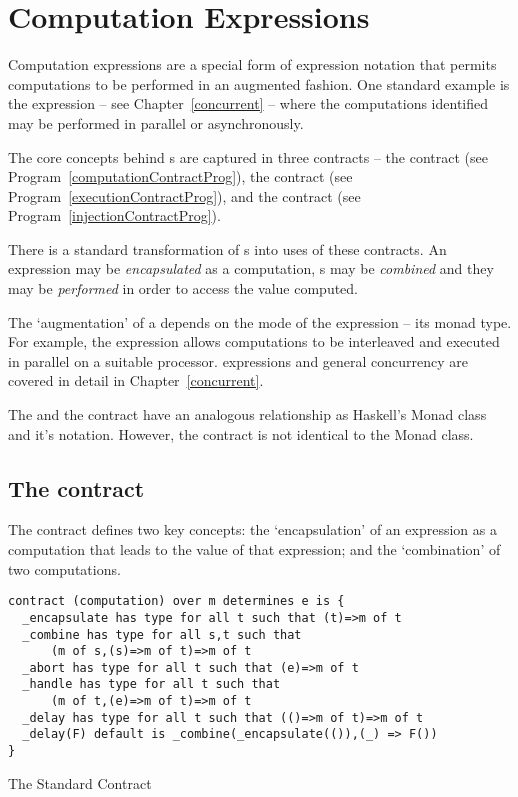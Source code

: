 \chapter{Computation Expressions}
\label{computation}
Computation expressions are a special form of expression notation that permits computations to be performed in an augmented fashion. One standard example is the  expression -- see Chapter~\vref{concurrent} -- where the computations identified may be performed in parallel or asynchronously.

The core concepts behind s are captured in three contracts -- the   contract (see Program~\vref{computationContractProg}), the  contract (see Program~\vref{executionContractProg}), and the  contract (see Program~\vref{injectionContractProg}). 

There is a standard transformation of s into uses of these contracts. An expression may be \emph{encapsulated} as a computation, s may be \emph{combined} and they may be \emph{performed} in order to access the value computed.

The `augmentation' of a  depends on the mode of the expression -- its monad type. For example, the  expression allows computations to be interleaved and executed in parallel on a suitable processor.  expressions and general concurrency are covered in detail in Chapter~\vref{concurrent}.

\begin{aside}
The  and the  contract have an analogous relationship as Haskell's Monad class and it's  notation. However, the  contract is not identical to the Monad class.
\end{aside}

\section{The  contract}
\label{computationContract}
The  contract defines two key concepts: the `encapsulation' of an expression as a computation that leads to the value of that expression; and the `combination' of two computations.


\begin{program}
\begin{lstlisting}
contract (computation) over m determines e is {
  _encapsulate has type for all t such that (t)=>m of t
  _combine has type for all s,t such that
      (m of s,(s)=>m of t)=>m of t
  _abort has type for all t such that (e)=>m of t
  _handle has type for all t such that
      (m of t,(e)=>m of t)=>m of t
  _delay has type for all t such that (()=>m of t)=>m of t
  _delay(F) default is _combine(_encapsulate(()),(_) => F())
}
\end{lstlisting}
\caption{The Standard  Contract\label{computationContractProg}}
\end{program}

